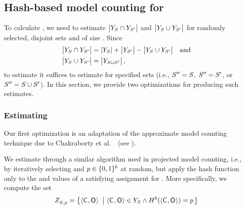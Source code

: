 \subsection{Hash-based model counting for \Jaccard{\secretsSetSize}}
\label{sscf:sec:impl:hash}

To calculate \Jaccard{\secretsSetSize}, we need to estimate
$\left|{Y_{S_{}} \cap
  Y_{S_{}'}}\right|$ and
$\left|{Y_{S_{}} \cup
  Y_{S_{}'}}\right|$ for randomly selected, disjoint
sets \secretsSet{} and \secretsSetAlt{} of size \secretsSetSize. Since 
\begin{align}
\left|{Y_{S_{}} \cap Y_{S_{}'}}\right|
& = \left|{Y_{S_{}}}\right|
  + \left|{Y_{S_{}'}}\right|
  - \left|{Y_{S_{}} \cup Y_{S_{}'}}\right|
  & \mathrm{and}
  \label{eqn:intersection}\\
\left|{Y_{S_{}} \cup Y_{S_{}'}}\right|
& = \left|{Y_{S_{} \cup S_{}'}}\right|,
  \label{eqn:union}
\end{align}
to estimate \Jaccard{\secretsSetSize} it suffices to estimate
\setSize{\possibleDoubles{\secretsSetAltAlt{}}} for specified sets
\secretsSetAltAlt{} (i.e., $S_{}'' = S_{}$,
$S_{}'' = S_{}'$, or $S_{}'' =
S_{} \cup S_{}'$). In this section, we provide two
optimizations for producing such estimates.

\subsubsection{Estimating \setSize{\possibleDoubles{\secretsSet{}}}}
\label{sscf:sec:impl:hash:possibleDoubles}
Our first optimization is an adaptation of the approximate model
counting technique due to Chakraborty et
al.~\cite{Chakraborty:2013:SAM:2961240.2961265}~(see ).

We estimate \setSize{\possibleDoubles{\secretsSet{}}} through a
similar algorithm used in projected model counting, i.e., by
iteratively selecting \hashPrefixFn{\hashFnOutputPrefixBits} and
$p \in \{0,1\}^{b}$ at
random, but apply the hash function only to the \ACIFn{} and \AOOFn{}
values of a satisfying assignment for \postcondition{\proc}{}.  More
specifically, we compute the set
\[
Z_{{S_{}},{p}}^{}
= \left\{\langle\mathsf{C}_{}, \mathsf{O}_{}\rangle ~\left|~
  \langle\mathsf{C}_{}, \mathsf{O}_{}\rangle \in Y_{S_{}} \wedge
    H^{b}(\langle\mathsf{C}_{},
    \mathsf{O}_{}\rangle) = p
    \right.\right\}
\]

